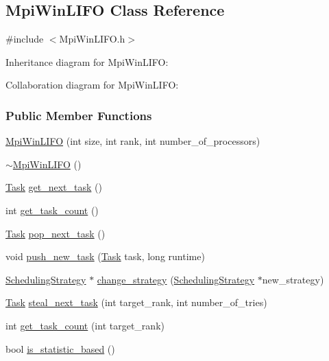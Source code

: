 \hypertarget{a00030}{}\subsection{Mpi\+Win\+L\+I\+F\+O Class Reference}
\label{a00030}


{\ttfamily \#include $<$Mpi\+Win\+L\+I\+F\+O.\+h$>$}



Inheritance diagram for Mpi\+Win\+L\+I\+F\+O\+:


Collaboration diagram for Mpi\+Win\+L\+I\+F\+O\+:
\subsubsection*{Public Member Functions}
\begin{DoxyCompactItemize}
\item 
\hyperlink{a00030_a46a7cbb4d81782b9ff7dbd971e5eb9ca}{Mpi\+Win\+L\+I\+F\+O} (int size, int rank, int number\+\_\+of\+\_\+processors)
\item 
\hyperlink{a00030_a39fbceec3a4fb97990a31ff556ce8ff5}{$\sim$\+Mpi\+Win\+L\+I\+F\+O} ()
\item 
\hyperlink{a00002}{Task} \hyperlink{a00030_a6de2bf8f36458582ebc800f2beda94c6}{get\+\_\+next\+\_\+task} ()
\item 
int \hyperlink{a00030_aeb679863632de7367029fded90eb4e5f}{get\+\_\+task\+\_\+count} ()
\item 
\hyperlink{a00002}{Task} \hyperlink{a00030_a93c2fdd8d75ce1264329edfa48d8864a}{pop\+\_\+next\+\_\+task} ()
\item 
void \hyperlink{a00030_a1336e4abb196dc1f3eba6e7e29f969aa}{push\+\_\+new\+\_\+task} (\hyperlink{a00002}{Task} task, long runtime)
\item 
\hyperlink{a00033}{Scheduling\+Strategy} $\ast$ \hyperlink{a00030_aa33f53bcf71ee26ff20039916cb321cd}{change\+\_\+strategy} (\hyperlink{a00033}{Scheduling\+Strategy} $\ast$new\+\_\+strategy)
\item 
\hyperlink{a00002}{Task} \hyperlink{a00030_a0631b1fc2042f19a5b438c8cfa44934a}{steal\+\_\+next\+\_\+task} (int target\+\_\+rank, int number\+\_\+of\+\_\+tries)
\item 
int \hyperlink{a00030_a4825ff8faf740b1f9e984813c20455ec}{get\+\_\+task\+\_\+count} (int target\+\_\+rank)
\item 
bool \hyperlink{a00030_ae65b1f7b9a7e5c8a2feaceafca0dd129}{is\+\_\+statistic\+\_\+based} ()
\end{DoxyCompactItemize}
